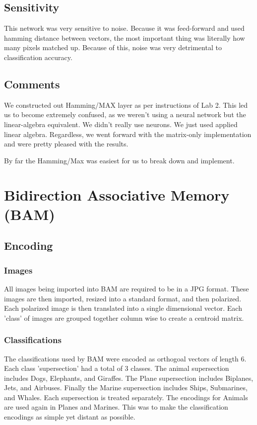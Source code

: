 \documentclass{article}
\begin{document}
\subsection{Sensitivity}
This network was very sensitive to noise. Because it was feed-forward and used hamming distance between vectors, the most important thing was literally how many pixels matched up. Because of this, noise was very detrimental to classification accuracy.

\subsection{Comments}
We constructed out Hamming/MAX layer as per instructions of Lab 2. This led us to become extremely confused, as we weren't using a neural network but the linear-algebra equivalent. We didn't really use neurons. We just used applied linear algebra. Regardless, we went forward with the matrix-only implementation and were pretty pleased with the results. 

By far the Hamming/Max was easiest for us to break down and implement.



\section{Bidirection Associative Memory (BAM)}

\subsection{Encoding}
\subsubsection{Images}
All images being imported into BAM are required to be in a JPG format. These
images are then imported, resized into a standard format, and then polarized.
Each polarized image is then translated into a single dimensional vector.
Each 'class' of images are grouped together column wise to create a centroid
matrix.

\subsubsection{Classifications}
The classifications used by BAM were encoded as orthogoal vectors of length 6.
Each class 'supersection' had a total of 3 classes. The animal supersection
includes Dogs, Elephants, and Giraffes. The Plane supersection includes Biplanes,
Jets, and Airbuses. Finally the Marine supersection includes Ships, Submarines,
and Whales. Each supersection is treated separately. The encodings for Animals
are used again in Planes and Marines. This was to make the classification
encodings as simple yet distant as possible.
\end{document}
